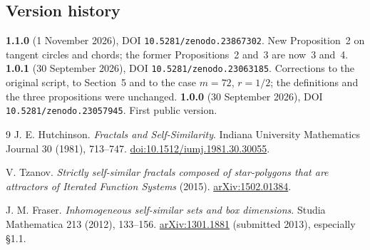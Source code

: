 \documentclass[11pt,a4paper]{article}
\newcommand{\reportdate}{1 November 2026}
\begin{document}
\subsection*{Version history}
\textbf{1.1.0} (\reportdate), DOI \texttt{10.5281/zenodo.23867302}. New
Proposition~2 on tangent circles and chords; the former Propositions~2
and~3 are now~3 and~4. \textbf{1.0.1}
(30 September 2026), DOI \texttt{10.5281/zenodo.23063185}. Corrections
to the original script, to Section~5 and to the case $m=72$, $r=1/2$;
the definitions and the three propositions were unchanged. \textbf{1.0.0} (30 September 2026), DOI
\texttt{10.5281/zenodo.23057945}. First public version.

\begingroup
\small
\renewcommand{\refname}{\sffamily\color{ink}References}
\begin{thebibliography}{9}
 J. E. Hutchinson.
\emph{Fractals and Self-Similarity}.
Indiana University Mathematics Journal 30 (1981), 713--747.
\href{https://doi.org/10.1512/iumj.1981.30.30055}{doi:10.1512/iumj.1981.30.30055}.

 V. Tzanov.
\emph{Strictly self-similar fractals composed of star-polygons that are
attractors of Iterated Function Systems} (2015).
\href{https://arxiv.org/abs/1502.01384}{arXiv:1502.01384}.

 J. M. Fraser.
\emph{Inhomogeneous self-similar sets and box dimensions}.
Studia Mathematica 213 (2012), 133--156.
\href{https://arxiv.org/abs/1301.1881}{arXiv:1301.1881} (submitted 2013),
especially \S1.1.
\end{thebibliography}
\endgroup
\end{document}
